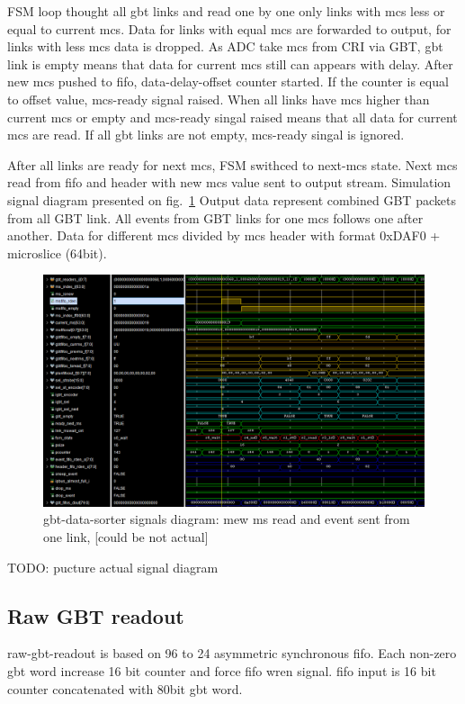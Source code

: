 \documentclass{article}
\begin{document}
FSM loop thought all gbt links and read one by one only links with mcs less or equal to current mcs. Data for links with equal mcs are forwarded to output, for links with less mcs data is dropped.  As ADC take mcs from CRI via GBT, gbt link is empty means that data for current mcs still can appears with delay. After new mcs pushed to fifo, data-delay-offset counter started. If the counter is equal to offset value, mcs-ready signal raised. 
When all links have mcs higher than current mcs or empty and mcs-ready singal raised means that all data for current mcs are read. If all gbt links are not empty, mcs-ready singal is ignored.

After all links are ready for next mcs, FSM swithced to next-mcs state. Next mcs read from fifo and header with new mcs value sent to output stream. Simulation signal diagram presented on fig.~\ref{fig:data-sorter} Output data represent combined GBT packets from all GBT link. All events from GBT links for one mcs follows one after another. Data for different mcs divided by mcs header with format 0xDAF0 + microslice (64bit). 

\begin{figure}[H]
	\centering 
	\includegraphics[width=1.0\textwidth]{pic_signals/gbt-sorter.png}
	\caption{\label{fig:data-sorter} gbt-data-sorter signals diagram: mew ms read and event sent from one link, [could be not actual]}
\end{figure}

TODO: pucture actual signal diagram



\subsection{Raw GBT readout}\label{sec:gbt-rd}
raw-gbt-readout is based on 96 to 24 asymmetric synchronous fifo. Each non-zero gbt word increase 16 bit counter and force fifo wren signal. fifo input is 16 bit counter concatenated with 80bit gbt word.
\end{document}
